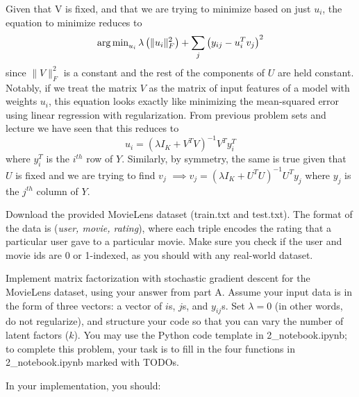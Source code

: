 \begin{solution}
	Given that V is fixed, and that we are trying to minimize based on just $u_i$, the equation to minimize reduces to $$\operatorname{arg\,min}_{u_i}\lambda \left( \|u_i\|_F^2\right) + \sum_{j} \left( y_{ij} - u_i^Tv_j\right)^2$$ since  $\|V\|^2_F$ is a constant and the rest of the components of $U$ are held constant. Notably, if we treat the matrix $V$ as the matrix of input features of a model with weights $u_i$, this equation looks exactly like minimizing the mean-squared error using linear regression with regularization. From previous problem sets and lecture we have seen that this reduces to
	$$u_{i} = (\lambda I_K + V^T V)^{-1} V^T y_{i}^T $$ where $y_{i}^T$ is the $i^{th}$ row of $Y$. 
	Similarly, by symmetry, the same is true given that $U$ is fixed and we are trying to find $v_j$ $\implies v_{j} = (\lambda I_K + U^T U)^{-1} U^T y_{j}$ where $y_{j}$ is the $j^{th}$ column of $Y$.
\end{solution}

\problem[10]Download the provided MovieLens dataset (train.txt and test.txt).  The format of the data is (\emph{user, movie, rating}), where each triple encodes the rating that a particular user gave to a particular movie. Make sure you check if the user and movie ids are 0 or 1-indexed, as you should with any real-world dataset.

Implement matrix factorization with stochastic gradient descent for the MovieLens dataset, using your answer from part A. Assume your input data is in the form of three vectors: a vector of $i$s, $j$s, and $y_{ij}$s. Set $\lambda = 0$ (in other words, do not regularize), and structure your code so that you can vary the number of latent factors ($k$). You may use the Python code template in 2_notebook.ipynb; to complete this problem, your task is to fill in the four functions in 2_notebook.ipynb marked with TODOs.

In your implementation, you should:

